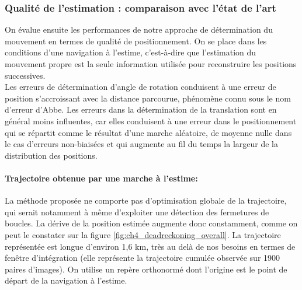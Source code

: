 \subsubsection{Qualité de l'estimation : comparaison avec l'état de l'art}
On évalue ensuite les performances de notre approche de détermination du mouvement en termes de qualité de positionnement. On se place dans les conditions d'une navigation à l'estime, c'est-à-dire que l'estimation du mouvement propre est la seule information utilisée pour reconstruire les positions successives. \\
Les erreurs de détermination d'angle de rotation conduisent à une erreur de position s'accroissant avec la distance parcourue, phénomène connu sous le nom d'erreur d'Abbe. Les erreurs dans la détermination de la translation sont en général moins influentes, car elles conduisent à une erreur dans le positionnement qui se répartit comme le résultat d'une marche aléatoire, de moyenne nulle dans le cas d'erreurs non-biaisées et qui augmente au fil du temps la largeur de la distribution des positions. \\

\paragraph{Trajectoire obtenue par une marche à l'estime:\\}
La méthode proposée ne comporte pas d'optimisation globale de la trajectoire, qui serait notamment à même d'exploiter une détection des fermetures de boucles. La dérive de la position estimée augmente donc constamment, comme on peut le constater sur la figure \ref{fig:ch4_deadreckoning_overall}. La trajectoire représentée est longue d'environ 1,6 km, très au delà de nos besoins en termes de fenêtre d'intégration (elle représente la trajectoire cumulée observée sur 1900 paires d'images). On utilise un repère orthonormé dont l'origine est le point de départ de la navigation à l'estime.


